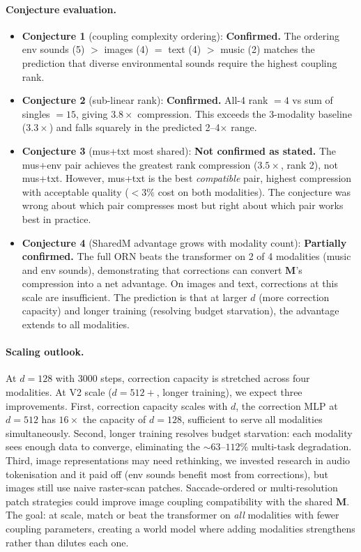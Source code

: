 \documentclass[11pt, a4paper]{article}
\newcommand{\M}{\mathbf{M}}
\theoremstyle{plain}
\theoremstyle{remark}
\begin{document}
\paragraph{Conjecture evaluation.}
\begin{itemize}[nosep]
    \item \textbf{Conjecture 1} (coupling complexity ordering): \textbf{Confirmed.}
    The ordering env sounds (5) $>$ images (4) $=$ text (4) $>$ music (2) matches the prediction that diverse environmental sounds require the highest coupling rank.

    \item \textbf{Conjecture 2} (sub-linear rank): \textbf{Confirmed.}
    All-4 rank $= 4$ vs sum of singles $= 15$, giving $3.8\times$ compression.
    This exceeds the 3-modality baseline ($3.3\times$) and falls squarely in the predicted 2--4$\times$ range.

    \item \textbf{Conjecture 3} (mus+txt most shared): \textbf{Not confirmed as stated.}
    The mus+env pair achieves the greatest rank compression ($3.5\times$, rank 2), not mus+txt.
    However, mus+txt is the best \emph{compatible} pair, highest compression with acceptable quality ($< 3\%$ cost on both modalities).
    The conjecture was wrong about which pair compresses most but right about which pair works best in practice.

    \item \textbf{Conjecture 4} (SharedM advantage grows with modality count): \textbf{Partially confirmed.}
    The full ORN beats the transformer on 2 of 4 modalities (music and env sounds), demonstrating that corrections can convert $\M$'s compression into a net advantage.
    On images and text, corrections at this scale are insufficient.
    The prediction is that at larger $d$ (more correction capacity) and longer training (resolving budget starvation), the advantage extends to all modalities.
\end{itemize}

\paragraph{Scaling outlook.}
At $d{=}128$ with 3000 steps, correction capacity is stretched across four modalities.
At V2 scale ($d{=}512{+}$, longer training), we expect three improvements.
First, correction capacity scales with $d$, the correction MLP at $d{=}512$ has $16\times$ the capacity of $d{=}128$, sufficient to serve all modalities simultaneously.
Second, longer training resolves budget starvation: each modality sees enough data to converge, eliminating the ${\sim}63$--$112\%$ multi-task degradation.
Third, image representations may need rethinking, we invested research in audio tokenisation and it paid off (env sounds benefit most from corrections), but images still use naive raster-scan patches.
Saccade-ordered or multi-resolution patch strategies could improve image coupling compatibility with the shared $\M$.
The goal: at scale, match or beat the transformer on \emph{all} modalities with fewer coupling parameters, creating a world model where adding modalities strengthens rather than dilutes each one.
\end{document}
